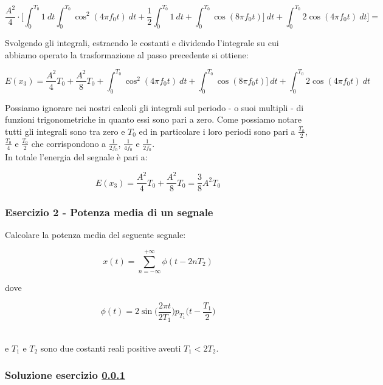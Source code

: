 \documentclass[../main.tex]{subfiles}
\begin{document}
\begin{equation}
	\frac{A^2}{4} \cdot \bigg[ \int_0^{T_0} 1 \:dt \int_0^{T_0} \cos^2(4\pi f_0 t) \: dt +  \frac{1}{2} \int_0^{T_0} 1\: dt + \int_0^{T_0} \cos(8\pi f_0 t) \big]\:dt + \int_0^{T_0} 2 \cos(4\pi f_0 t)\: dt \bigg] =
\end{equation}

Svolgendo gli integrali, estraendo le costanti e dividendo l'integrale su cui abbiamo operato la trasformazione al passo precedente si ottiene:

\begin{equation}
	E(x_3) = \frac{A^2}{4} T_0 + \frac{A^2}{8} T_0 + \int_0^{T_0} \cos^2(4\pi f_0 t) \: dt + \int_0^{T_0} \cos(8\pi f_0 t) \big]\:dt + \int_0^{T_0} 2 \cos(4\pi f_0 t)\: dt
\end{equation}

Possiamo ignorare nei nostri calcoli gli integrali sul periodo - o suoi multipli - di funzioni trigonometriche in quanto essi sono pari a zero. Come possiamo notare tutti gli integrali sono tra zero e $T_0$ ed in particolare i loro periodi sono pari a $\frac{T_0}{2}$, $\frac{T_0}{4}$ e $\frac{T_0}{2}$ che corrispondono a $\frac{1}{2f_0}$, $\frac{1}{4f_0}$ e $\frac{1}{2f_0}$.\\

In totale l'energia del segnale è pari a:

\begin{equation}
	E(x_3) = \frac{A^2}{4} T_0 + \frac{A^2}{8} T_0  = \frac{3}{8} A^2 T_0
\end{equation}

\vspace*{1.5cm}
\subsubsection{Esercizio 2 - Potenza media di un segnale}
\label{ss2}

Calcolare la potenza media del seguente segnale:

\[ x(t) = \sum_{n = - \infty}^{+ \infty} \phi(t - 2nT_2) \]

dove

\[ \phi(t) = 2\sin \bigg( \frac{2\pi t}{2T_1} \bigg) p_{T_1} \bigg ( t - \frac{T_1}{2} \bigg)  \]\

e $T_1$ e $T_2$ sono due costanti reali positive aventi $T_1 < 2T_2$.

\subsubsection*{Soluzione esercizio \ref{ss2}}
\end{document}
